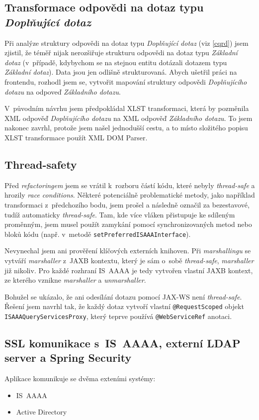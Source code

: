 \documentclass[thesis=M,czech]{FITthesis}[2019/12/23]
\begin{document}
\subsection{Transformace odpovědi na dotaz typu \textit{Doplňující dotaz}}
\label{Transf}
Při analýze struktury odpovědi na dotaz typu \textit{Doplňující dotaz} (viz \ref{cqrd}) jsem zjistil, že téměř nijak nerozšiřuje strukturu odpovědi na dotaz typu \textit{Základní dotaz} (v~případě, kdybychom se na stejnou entitu dotázali dotazem typu \textit{Základní dotaz}). Data jsou jen odlišně strukturovaná. Abych ušetřil práci na frontendu, rozhodl jsem se, vytvořit mapování struktury odpovědi \textit{Doplňujícího dotazu} na odpoveď \textit{Základního dotazu}.

V~původním návrhu jsem předpokládal XLST transformaci, která by pozměnila XML odpověď \textit{Doplňujícího dotazu} na XML odpověď \textit{Základního dotazu}. To jsem nakonec zavrhl, protože jsem našel jednodušší cestu, a to místo složitého popisu XLST transformace použít XML DOM Parser. \cite{DOMParser}

\subsection{Thread-safety}
Před \textit{refactoringem} jsem se vrátil k~rozboru částí kódu, které nebyly \textit{thread-safe} a hrozily \textit{race conditions}. Některé potenciálně problematické metody, jako například transformaci z~předchozího bodu, jsem prošel a následně označil za bezestavové, tudíž automaticky \textit{thread-safe}. Tam, kde více vláken přistupuje ke sdíleným proměnným, jsem musel použít zamykání pomocí synchronizovaných metod nebo bloků kódu (např. v~metodě \texttt{setPreferredISAAAInterface}). \cite{ThreadSafety}

Nevynechal jsem ani prověření klíčových externích knihoven. Při \textit{marshallingu} se vytváří \textit{marshaller} z~JAXB kontextu, který je sám o~sobě \textit{thread-safe}, \textit{marshaller} již nikoliv. \cite{JAXBThreadSafe}
Pro každé rozhraní IS~AAAA je tedy vytvořen vlastní JAXB kontext, ze kterého vznikne \textit{marshaller} a \textit{unmarshaller}. 

Bohužel se ukázalo, že ani odesílání dotazu pomocí JAX-WS není \textit{thread-safe}. 
Řešení jsem navrhl tak, že každý dotaz vytvoří vlastní \texttt{@RequestScoped} objekt \texttt{ISAAAQueryServicesProxy}, který teprve používá \texttt{@WebServiceRef} anotaci. \cite{JaxWSThreadSafe}

\subsection{SSL komunikace s~IS~AAAA, externí LDAP server a Spring Security}
Aplikace komunikuje se dvěma exteními systémy:
\begin{itemize}
	\item IS~AAAA	
	\item Active Directory
\end{itemize}
\end{document}
